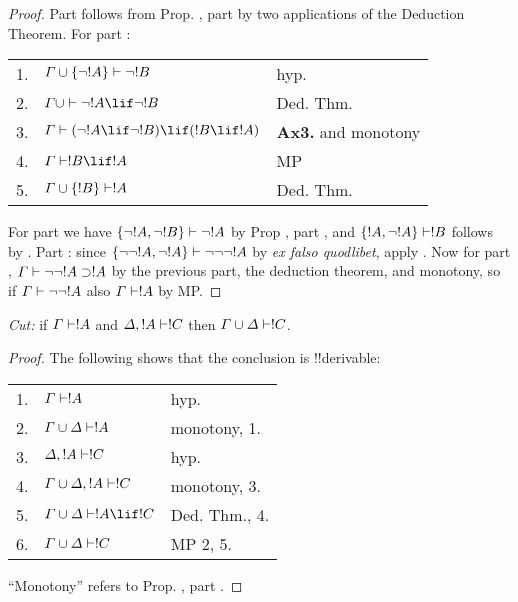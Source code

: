 \documentclass[../../include/open-logic-section]{subfiles}
\begin{document}
\begin{proof} Part  follows from Prop.
, part
 by two applications of the
Deduction Theorem. For part :

\begin{tabular}{rll} 
1. & $\Gamma \cup \{ \lnot !A\} \Proves \lnot !B$ &
hyp. \\ 
2. & $\Gamma \cup \Proves \lnot !A \lif \lnot !B$ & Ded. Thm.\\ 
3. & $\Gamma \Proves (\lnot !A \lif \lnot !B) \lif (!B \lif !A)$ &
\textbf{Ax3.} and monotony \\ 
4. & $\Gamma \Proves !B \lif !A$ & MP \\ 
5. & $\Gamma \cup \{ !B\} \Proves !A$ & Ded. Thm. 
\end{tabular}
  
\noindent For part  we have $\{\lnot !A,
\lnot !B \} \Proves \lnot !A$ by Prop ,
part , and $\{ !A, \lnot!A\}
\Proves !B$ follows by . Part
: since $\{\lnot\lnot !A, \lnot !A \}
\Proves \lnot \lnot\lnot !A$ by \emph{ex falso quodlibet}, apply
. Now for part
, $\Gamma \Proves \lnot\lnot !A \supset
!A$ by the previous part, the deduction theorem, and monotony, so if
$\Gamma \Proves \lnot\lnot!A$ also $\Gamma \Proves !A$ by MP. 
\end{proof}

\begin{thm} \emph{Cut:} if $\Gamma \Proves !A$ and $\Delta, !A \Proves !C$
then $\Gamma \cup \Delta \Proves !C$. 
\end{thm}

\begin{proof} The following shows that the conclusion is !!{derivable}:

\begin{tabular}{rll} 
1. & $\Gamma \Proves !A$ & hyp. \\ 
2. &$\Gamma\cup\Delta \Proves !A$ & monotony, 1.\\ 
3. & $\Delta, !A \Proves !C$ & hyp. \\ 
4. & $\Gamma \cup \Delta, !A \Proves !C$ & monotony, 3.\\ 
5. & $\Gamma \cup \Delta \Proves !A \lif !C$ & Ded. Thm., 4.\\ 
6. & $\Gamma \cup \Delta \Proves !C$ & MP 2, 5. 
\end{tabular}

\smallskip\noindent ``Monotony'' refers to Prop.
, part
. 
\end{proof}
\end{document}
